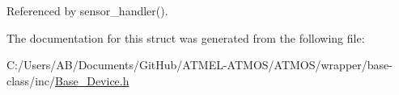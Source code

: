 Referenced by sensor\-\_\-handler().



The documentation for this struct was generated from the following file\-:\begin{DoxyCompactItemize}
\item 
C\-:/\-Users/\-A\-B/\-Documents/\-Git\-Hub/\-A\-T\-M\-E\-L-\/\-A\-T\-M\-O\-S/\-A\-T\-M\-O\-S/wrapper/base-\/class/inc/\hyperlink{_base___device_8h}{Base\-\_\-\-Device.\-h}\end{DoxyCompactItemize}
